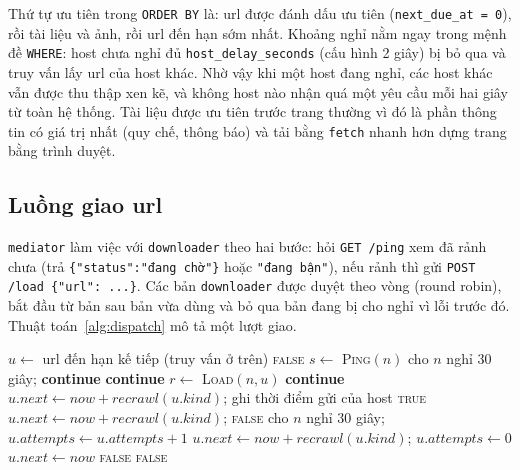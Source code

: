 \documentclass[12pt,a4paper]{report}
\begin{document}
Thứ tự ưu tiên trong \texttt{ORDER BY} là: url được đánh dấu ưu tiên (\texttt{next\_\allowbreak{}due\_\allowbreak{}at = 0}), rồi tài liệu và ảnh, rồi url đến hạn sớm nhất. Khoảng nghỉ nằm ngay trong mệnh đề \texttt{WHERE}: host chưa nghỉ đủ \texttt{host\_\allowbreak{}delay\_\allowbreak{}seconds} (cấu hình 2 giây) bị
bỏ qua và truy vấn lấy url của host khác. Nhờ vậy khi một host đang nghỉ, các host khác vẫn được thu thập xen kẽ, và
không host nào nhận quá một yêu cầu mỗi hai giây từ toàn hệ thống. Tài liệu được ưu tiên trước trang thường vì đó là
phần thông tin có giá trị nhất (quy chế, thông báo) và tải bằng \texttt{fetch} nhanh hơn dựng trang bằng trình duyệt.

\subsection{Luồng giao url}

\texttt{mediator} làm việc với \texttt{downloader} theo hai bước: hỏi \texttt{GET /ping} xem đã rảnh chưa (trả
\texttt{\{"status":"đang chờ"\}} hoặc \texttt{"đang bận"}), nếu rảnh thì gửi \texttt{POST /load \{"url": ...\}}. Các bản
\texttt{downloader} được duyệt theo vòng (round robin), bắt đầu từ bản sau bản vừa dùng và bỏ qua bản đang bị cho nghỉ
vì lỗi trước đó. Thuật toán~\ref{alg:dispatch} mô tả một lượt giao.

\begin{algorithm}[ht]
\caption{Một lượt giao url của mediator}\label{alg:dispatch}
\begin{algorithmic}[1]
\State $u \gets$ url đến hạn kế tiếp (truy vấn ở trên)
 \State \Return \textsc{false} 
\EndIf
{}
  \State $s \gets$ \textsc{Ping}$(n)$ 
   \State cho $n$ nghỉ 30 giây; \textbf{continue}
   \State \textbf{continue}
  \EndIf
  \State $r \gets$ \textsc{Load}$(n, u)$ 
   \State \textbf{continue} 
    \State $u.\mathit{next} \gets now + \mathit{recrawl}(u.\mathit{kind})$; ghi thời điểm gửi của host
    \State \Return \textsc{true}
   
    \State $u.\mathit{next} \gets now + \mathit{recrawl}(u.\mathit{kind})$; \Return \textsc{false}
  \Else {}
    \State cho $n$ nghỉ 30 giây; $u.\mathit{attempts} \gets u.\mathit{attempts} + 1$
     \State $u.\mathit{next} \gets now + \mathit{recrawl}(u.\mathit{kind})$; $u.\mathit{attempts} \gets 0$
    \Else \State $u.\mathit{next} \gets now$ 
    \EndIf
    \State \Return \textsc{false}
  \EndIf
\EndFor
\State \Return \textsc{false}
\end{algorithmic}
\end{algorithm}
\end{document}
